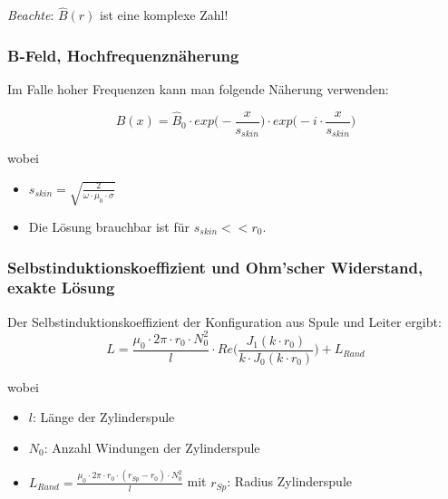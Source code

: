 \emph{Beachte}: $\hat{B} (r)$ ist eine komplexe Zahl!


\subsubsection{B-Feld, Hochfrequenzn\"aherung}
\label{sec:arbgru:subsec:vollzylinder:bFeldapprox}


Im Falle hoher Frequenzen kann man folgende N\"aherung verwenden:

\begin{equation}
    \label{eq:vollzylinder:bFeldApprox}
    \hat{B} (x) = \hat{B}_0 \cdot exp\Biggl(-\frac{x}{s_{skin}} \Biggr) \cdot exp\Biggl(-i \cdot \frac{x}{s_{skin}} \Biggr)
\end{equation}

wobei
\begin{itemize}
    \item[]
        $s_{skin} = \sqrt{\frac{2}{\omega \cdot \mu_0 \cdot \sigma}}$
    \item[]
        Die L\"osung brauchbar ist f\"ur $s_{skin} << r_0$.
\end{itemize}




\subsubsection{Selbstinduktionskoeffizient und Ohm'scher Widerstand, exakte L\"osung}
\label{sec:arbgru:subsec:vollzylinder:LRexakt}

Der Selbstinduktionskoeffizient der Konfiguration aus Spule und Leiter ergibt:
\begin{equation}
    \label{eq:vollzylinder:LExact}
    L = \frac{\mu_0 \cdot 2\pi \cdot r_0 \cdot N_0^2}{l} \cdot Re \Biggl(\frac{J_1 (k \cdot r_0)}{k \cdot J_0 (k \cdot r_0)} \Biggr) + L_{Rand}
\end{equation}

wobei
\begin{itemize}
    \item[]
        $l$: L\"ange der Zylinderspule
    \item[]
        $N_0$: Anzahl Windungen der Zylinderspule
    \item[]
        $L_{Rand} = \frac{\mu_0 \cdot 2\pi \cdot r_0 \cdot (r_{Sp} - r_0) \cdot N_0^2}{l}$ mit $r_{Sp}$: Radius Zylinderspule
\end{itemize}


